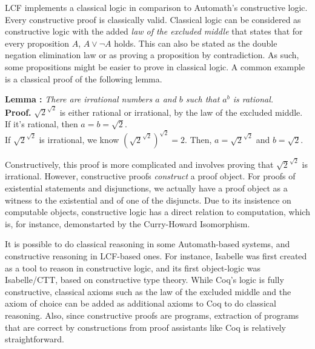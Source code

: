 \documentclass{article}
\begin{document}
	LCF implements a classical logic
	in comparison to Automath's 
	constructive logic. Every 
	constructive proof is classically 
	valid. Classical logic can 
	be considered as constructive 
	logic with the added 
	\textit{law of the excluded 
	middle} that states that for 
	every proposition $A$, 
	$A \lor \neg A$ holds. This can 
	also be stated as the 
	double negation elimination 
	law or as proving a 
	proposition by contradiction. As
	such, some propositions might be 
	easier to prove in classical 
	logic. A common example is a 
	classical proof of the 
	following lemma. 
	
	\textbf{Lemma : } \textit{There are 
	irrational numbers $a$ and $b$ 
	such that $a^b$ is rational.}\\
	\textbf{Proof. }
	$\sqrt{2}^{\sqrt{2}}$ is either 
	rational or irrational, by the 
	law of the excluded middle. \\
	If it's rational, then 
	$a = b = \sqrt{2}$. \\
	If $\sqrt{2}^{\sqrt{2}}$ is 
	irrational, we know 
	$(\sqrt{2}^{\sqrt{2}})^{\sqrt{2}} = 
	2$. Then, $a = \sqrt{2}^{\sqrt{2}}$
	and $b = \sqrt{2}$.
	
	Constructively, this proof is 
	more complicated and involves 
	proving that $\sqrt{2}^{\sqrt{2}}$
	is irrational. However,
	constructive proofs 
	\textit{construct} a proof object. 
	For proofs of existential 
	statements and disjunctions, we 
	actually have a proof object as a 
	witness to the existential and 
	of one of the disjuncts. Due 
	to its insistence on computable 
	objects, constructive logic has 
	a direct relation to computation, 
	which is, for instance, demonstarted 
	by the Curry-Howard Isomorphism.
	
	It is possible to do classical 
	reasoning in some Automath-based
	systems, and constructive reasoning 
	in LCF-based ones. For instance, 
	Isabelle was first created as 
	a tool to reason in constructive 
	logic, and its first object-logic
	was Isabelle/CTT, based on 
	constructive type theory. While
	Coq's logic is fully constructive,
	classical axioms such as the 
	law of the excluded middle and the 
	axiom of choice can be added as 
	additional axioms to Coq to do 
	classical reasoning. Also, since 
	constructive proofs are 
	programs, extraction of 
	programs that are correct
	by constructions from proof 
	assistants like Coq is relatively 
	straightforward.
	
\end{document}
